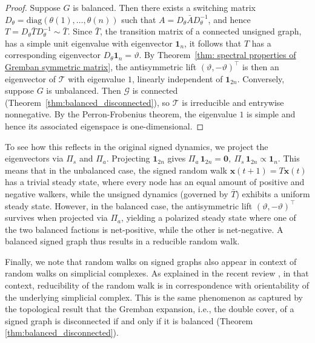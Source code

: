 \documentclass[reprint,onecolumn]{article}
\newcommand{\mc}[1]{\mathcal{#1}}
\newcommand{\1}{\mathbb{1}}
\newcommand{\x}{\mathbf{x}}
\newcommand{\0}{\mathbf{0}}
\newcommand{\diag}{\textrm{diag}}
\begin{document}
\begin{proof}
 Suppose \(G\) is balanced. 
Then there exists a switching matrix 
\(D_\theta=\diag(\theta(1),\dots,\theta(n))\) such that 
\(A=D_\theta \bar A D_\theta^{-1}\), and hence 
\(T=D_\theta \bar T D_\theta^{-1}\sim \bar T\). 
Since \(\bar T\), the transition matrix of a connected unsigned graph, 
has a simple unit eigenvalue with eigenvector \(\mathbf{1}_n\), 
it follows that \(T\) has a corresponding eigenvector 
\(D_\theta \mathbf{1}_n = \vartheta\). 
By Theorem~\ref{thm: spectral properties of Gremban symmetric matrix}, 
the antisymmetric lift \((\vartheta,-\vartheta)^\top\) is then an 
eigenvector of \(\mc T\) with eigenvalue \(1\), 
linearly independent of \(\mathbf{1}_{2n}\). 
 Conversely, suppose \(G\) is unbalanced. 
Then \(\mc G\) is connected 
(Theorem~\ref{thm:balanced_disconnected}), 
so \(\mc T\) is irreducible and entrywise nonnegative. 
By the Perron-Frobenius theorem, the eigenvalue \(1\) is simple and hence its associated eigenspace is one-dimensional.
\end{proof}
To see how this reflects in the original signed dynamics, we project the eigenvectors via $\Pi_s$ and $\Pi_a$.
Projecting $\mathbf1_{2n}$ gives
\(
\Pi_a\,\mathbf1_{2n}=\0,
\
\Pi_s\,\mathbf1_{2n}\propto\mathbf1_n
\). This means that in the unbalanced case, the signed random walk $\x(t+1)=T\x(t)$ has a trivial steady state, where every node has an equal amount of positive and negative walkers, while the unsigned dynamics (governed by $\bar T$) exhibits a uniform steady state. However, in the balanced case, the antisymmetric lift $(\vartheta, -\vartheta)^\top$ survives when projected via $\Pi_a$, yielding a polarized steady state where one of the two balanced factions is net-positive, while the other is net-negative. A balanced signed graph thus results in a reducible random walk.

Finally, we note that random walks on signed graphs also appear in context of random walks on simplicial complexes. As explained in the recent review \cite{eidi2023irreducibilitymarkovchainssimplicial}, in that context, reducibility of the random walk is in correspondence with orientability of the underlying simplicial complex. This is the same phenomenon as captured by the topological result that the Gremban expansion, i.e., the double cover, of a signed graph is disconnected if and only if it is balanced (Theorem \ref{thm:balanced_disconnected}).
%
\end{document}
